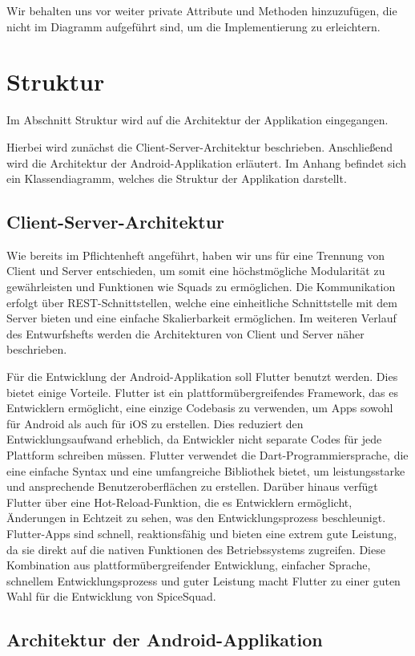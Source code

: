 \documentclass{entwurfsheft}
\begin{document}
Wir behalten uns vor weiter private Attribute und Methoden hinzuzufügen, die nicht im Diagramm aufgeführt sind, um die Implementierung zu erleichtern.
\section{Struktur}
Im Abschnitt Struktur wird auf die Architektur der Applikation eingegangen.

Hierbei wird zunächst die Client-Server-Architektur beschrieben.
Anschließend wird die Architektur der Android-Applikation erläutert.
Im Anhang befindet sich ein Klassendiagramm, welches die Struktur der Applikation darstellt.

\subsection{Client-Server-Architektur}
Wie bereits im Pflichtenheft angeführt, haben wir uns für eine Trennung von Client und Server entschieden, um somit eine höchstmögliche Modularität zu gewährleisten und
Funktionen wie Squads zu ermöglichen. Die Kommunikation erfolgt über REST-Schnittstellen, welche eine einheitliche Schnittstelle mit dem Server bieten und eine einfache Skalierbarkeit ermöglichen.
Im weiteren Verlauf des Entwurfshefts werden die Architekturen von Client und Server näher beschrieben.

Für die Entwicklung der Android-Applikation soll Flutter benutzt werden. Dies bietet einige Vorteile. Flutter ist ein plattformübergreifendes Framework, das es Entwicklern ermöglicht, eine einzige Codebasis zu verwenden, um Apps sowohl für Android als auch für iOS zu erstellen. Dies reduziert den Entwicklungsaufwand erheblich, da Entwickler nicht separate Codes für jede Plattform schreiben müssen. Flutter verwendet die Dart-Programmiersprache, die eine einfache Syntax und eine umfangreiche Bibliothek bietet, um leistungsstarke und ansprechende Benutzeroberflächen zu erstellen. Darüber hinaus verfügt Flutter über eine Hot-Reload-Funktion, die es Entwicklern ermöglicht, Änderungen in Echtzeit zu sehen, was den Entwicklungsprozess beschleunigt. Flutter-Apps sind schnell, reaktionsfähig und bieten eine extrem gute Leistung, da sie direkt auf die nativen Funktionen des Betriebssystems zugreifen. Diese Kombination aus plattformübergreifender Entwicklung, einfacher Sprache, schnellem Entwicklungsprozess und guter Leistung macht Flutter zu einer guten Wahl für die Entwicklung von SpiceSquad.
\subsection{Architektur der Android-Applikation}
\end{document}
